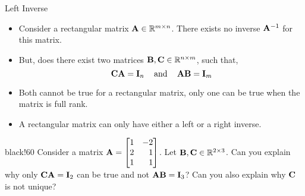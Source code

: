 \documentclass[aspectratio=169]{beamer}
\def\mf{\ensuremath\mathbf}
\def\mb{\ensuremath\mathbb}
\newcommand{\demoex}[2]{\onslide<#1->\begin{color}{black!60} #2 \end{color}}
\begin{document}
\begin{frame}[t]{Left Inverse}
\vspace{-0.25cm}
\begin{itemize}
    \item Consider a rectangular matrix $\mf{A} \in \mb{R}^{m \times n}$. There exists no inverse $\mf{A}^{-1}$ for this matrix.

    \item But, does there exist two matrices $\mf{B}, \mf{C} \in \mb{R}^{n \times m}$, such that,
    \[ \mf{CA} = \mf{I}_n \,\,\,\,\, \text{ and } \,\,\,\,\, \mf{AB} = \mf{I}_m \]

    \item Both cannot be true for a rectangular matrix, only one can be true when the matrix is full rank.

    \item A rectangular matrix can only have either a left or a right inverse.

\end{itemize}

\demoex{2}{
    Consider a matrix $\mf{A} = \begin{bmatrix*}[r]1 & -2\\2 & 1\\1 & 1\end{bmatrix*}$. Let $\mf{B}, \mf{C}  \in \mb{R}^{2 \times 3}$. Can you explain why only $\mf{CA} = \mf{I}_2$ can be true and not $\mf{AB} = \mf{I}_3$? Can you also explain why $\mf{C}$ is not unique?
}
\end{frame}
\end{document}
